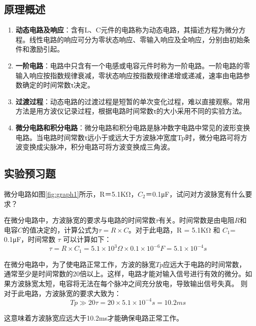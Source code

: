 \documentclass[dvipsnames, svgnames,a4paper,11pt]{article}
\begin{document}
	\subsection{原理概述}
	\begin{enumerate}
		\item \textbf{动态电路及响应}：含有L、C元件的电路称为动态电路，其描述方程为微分方程。线性电路的响应可分为零状态响应、零输入响应及全响应，分别由初始条件和激励引起。

		\item \textbf{一阶电路}：电路中只含有一个电感或电容元件时称为一阶电路。一阶电路的零输入响应按指数规律衰减，零状态响应按指数规律递增或递减，速率由电路参数确定的时间常数τ决定。
		
		\item \textbf{过渡过程}：动态电路的过渡过程是短暂的单次变化过程，难以直接观察。常用方法是用方波仪记录过程，根据电路时间常数τ的大小采用不同的实验方法。
		
		\item \textbf{微分电路和积分电路}：微分电路和积分电路是脉冲数字电路中常见的波形变换电路。当电路时间常数τ远小于或远大于方波脉冲宽度Tp时，微分电路可将方波变换成尖脉冲，积分电路可将方波变换成三角波。
	\end{enumerate}
	
	
	
	\subsection{实验预习题}
	
	\begin{question}
		微分电路如图\ref*{fig:graph1}所示，R＝5.1KΩ，$C_2$＝0.1μF，试问对方波脉宽有什么要求？
	\end{question}



		在微分电路中，方波脉宽的要求与电路的时间常数$\tau$有关。时间常数是由电阻$R$和电容$C$的值决定的，计算公式为$ \tau = R \times C$。对于此电路，R = 5.1KΩ 和 $C_1$​ = 0.1μF，时间常数 $\tau$ 可以计算如下：
		\[
			\tau=R\times C_1​=5.1\times10^3\Omega×0.1×10^{−6}F=5.1×10^{−4}s
		\]
		
		在微分电路中，为了使电路正常工作，方波的脉宽$Tp$应远大于电路的时间常数，通常至少是时间常数的20倍以上。这样，电路才能对输入信号进行有效的微分。如果方波脉宽太短，电容将无法在每个脉冲之间充分放电，导致输出信号失真。
		则对于此电路，方波脉宽的要求大致为：
		\[
			Tp\gg20\tau=20×5.1×10^{−4}s=10.2ms
		\]
		
		这意味着方波脉宽应远大于10.2ms才能确保电路正常工作。
\end{document}
